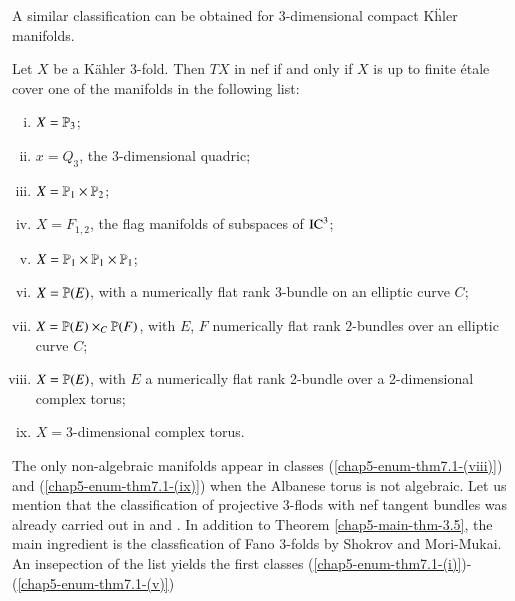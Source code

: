 A similar classification can be obtained for 3-dimensional compact K\"hler manifolds.

\setcounter{section}{7}
\setcounter{definition}{0}
\begin{secthm}\label{chap5-thm-7.1}
Let $X$ be a K\"ahler 3-fold. Then $TX$ in nef if and only if $X$ is up to finite \'etale cover one of the manifolds in the following list:
 \begin{enumerate}[(i)]
    \item $X = \mathbb{P}_{3}$;\label{chap5-enum-thm7.1-(i)}
    \item $x = Q_{3}$, the 3-dimensional quadric;\label{chap5-enum-thm7.1-(ii)}
    \item $X= \mathbb{P}_{1} \times \mathbb{P}_{2}$;\label{chap5-enum-thm7.1-(iii)}
    \item $X = F_{1,2}$, the flag manifolds of subspaces of $\operatorname{IC}^{3}$;\label{chap5-enum-thm7.1-(iv)}
    \item  $X= \mathbb{P}_{1} \times \mathbb{P}_{1} \times \mathbb{P}_{1}$;\label{chap5-enum-thm7.1-(v)}
    \item $X = \mathbb{P}(E)$, with a numerically flat rank 3-bundle on an elliptic curve $C$;\label{chap5-enum-thm7.1-(vi)}
    \item $X= \mathbb{P}(E)\times _{C}\mathbb{P}(F)$, with $E$, $F$ numerically flat rank $2$-bundles over an elliptic curve $C$;\label{chap5-enum-thm7.1-(vii)}
    \item $X= \mathbb{P}(E)$, with $E$ a numerically flat rank 2-bundle over a 2-dimensional complex torus;\label{chap5-enum-thm7.1-(viii)}
    \item $X= 3$-dimensional complex torus. \label{chap5-enum-thm7.1-(ix)}
 \end{enumerate}
\end{secthm}

 The only non-algebraic manifolds appear in classes (\ref{chap5-enum-thm7.1-(viii)}) and (\ref{chap5-enum-thm7.1-(ix)}) when the Albanese torus is not algebraic. Let us mention that the classification of projective 3-flods with nef tangent bundles was already carried out in \cite{chap5-keyCP91} and \cite{chap5-keyZh90}. In addition to Theorem
 \ref{chap5-main-thm-3.5}, the main ingredient is the classfication of Fano 3-folds by Shokrov and Mori-Mukai. An insepection of the list yields the first classes (\ref{chap5-enum-thm7.1-(i)})-(\ref{chap5-enum-thm7.1-(v)}) 

